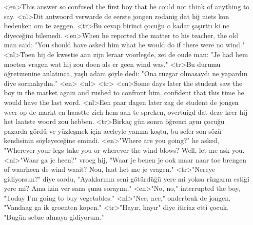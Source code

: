 <en>This answer so confused the first boy that he could not think of anything to say.
<nl>Dit antwoord verwarde de eerste jongen zodanig dat hij niets kon bedenken om te zeggen.
<tr>Bu cevap birinci çocuğu o kadar şaşırttı ki ne diyeceğini bilemedi.
<en>When he reported the matter to his teacher, the old man said: "You should have asked him what he would do if there were no wind."
<nl>Toen hij de kwestie aan zijn leraar voorlegde, zei de oude man: "Je had hem moeten vragen wat hij zou doen als er geen wind was."
<tr>Bu durumu öğretmenine anlatınca, yaşlı adam şöyle dedi: "Ona rüzgar olmasaydı ne yapardın diye sormalıydın."
<en>
<nl>
<tr>
<en>Some days later the student saw the boy in the market again and rushed to confront him, confident that this time he would have the last word.
<nl>Een paar dagen later zag de student de jongen weer op de markt en haastte zich hem aan te spreken,  overtuigd dat deze keer hij het laatste woord zou hebben.
<tr>Birkaç gün sonra öğrenci aynı çocuğu pazarda gördü ve yüzleşmek için aceleyle yanına koştu, bu sefer son sözü kendisinin söyleyeceğine emindi.
<en>"Where are you going?" he asked,  "Wherever your legs take you or wherever the wind blows? Well, let me ask you.
<nl>"Waar ga je heen?" vroeg hij,  "Waar je benen je ook maar naar toe  brengen of waarheen de wind waait? Nou, laat het me je vragen."
<tr>"Nereye gidiyorsun?" diye sordu, "Ayaklarının seni götürdüğü yere mi yoksa rüzgarın estiği yere mi? Ama izin ver sana şunu sorayım."
<en>"No, no," interrupted the boy,  "Today I’m going to buy vegetables."
<nl>"Nee, nee," onderbrak de jongen, "Vandaag ga ik groenten kopen."
<tr>"Hayır, hayır" diye itiriaz etti çocuk, "Bugün sebze almaya gidiyorum."
